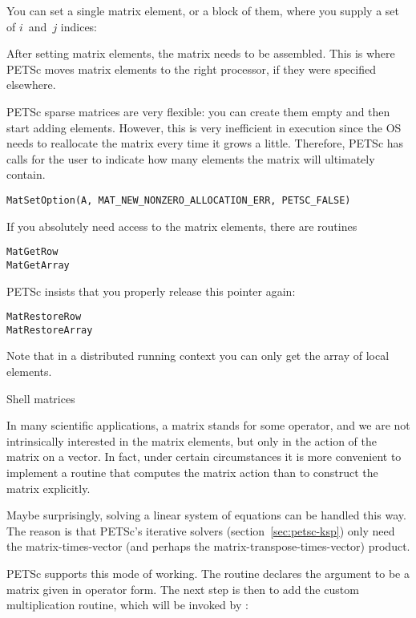 You can set a single matrix element, or a block of them, where you
supply a set of $i$~and~$j$ indices:
%

After setting matrix elements, the matrix needs to be assembled. This
is where PETSc moves matrix elements to the right processor, if they
were specified elsewhere.
%

PETSc sparse matrices are very flexible: you can create them empty and
then start adding elements. However, this is very inefficient in
execution since the \ac{OS} needs to reallocate the matrix every time
it grows a little. Therefore, PETSc has calls for the user to indicate
how many elements the matrix will ultimately contain.
%

\begin{verbatim}
MatSetOption(A, MAT_NEW_NONZERO_ALLOCATION_ERR, PETSC_FALSE)
\end{verbatim}

If you absolutely need access to the matrix elements, there are routines

\begin{lstlisting}
MatGetRow
MatGetArray
\end{lstlisting}

PETSc insists that you properly release this pointer again:

\begin{lstlisting}
MatRestoreRow
MatRestoreArray
\end{lstlisting}

Note that in a distributed running context you can only get the array of local elements.

 {Shell matrices}

In many scientific applications, a matrix stands for some operator,
and we are not intrinsically interested in the matrix elements, but
only in the action of the matrix on a vector. In fact, under certain
circumstances it is more convenient to implement a routine that
computes the matrix action than to construct the matrix explicitly.

Maybe surprisingly, solving a linear system of equations can be
handled this way. The reason is that PETSc's iterative solvers
(section~\ref{sec:petsc-ksp}) only need the matrix-times-vector (and perhaps
the matrix-transpose-times-vector) product.

PETSc supports this mode of working. The routine 
%
%
declares the argument to be a matrix given in operator form.
The next step is then to add the custom multiplication routine, which
will be invoked by :
%

